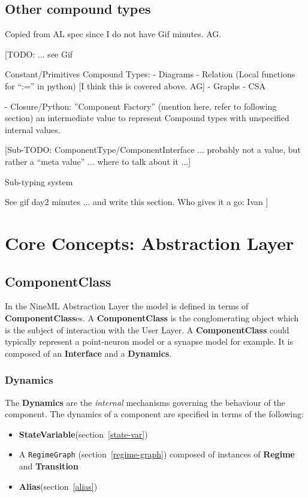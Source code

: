 \documentclass{article}
\newcommand{\ComponentClass}{{\bf{ComponentClass}}\xspace}
\newcommand{\ComponentClasses}{{\bf{ComponentClass}}es\xspace}
\newcommand{\Dynamics}{{\bf{Dynamics}}\xspace}
\newcommand{\Interface}{{\bf{Interface}}\xspace}
\newcommand{\StateVariable}{{\bf{StateVariable}}\xspace}
\newcommand{\Alias}{{\bf{Alias}}\xspace}
\newcommand{\Regime}{{\bf{Regime}}\xspace}
\newcommand{\Transition}{{\bf{Transition}}\xspace}
\begin{document}
\subsection{Other compound types}

Copied from AL spec since I do not have Gif minutes. AG.

[TODO: ... see Gif

Constant/Primitives
Compound Types:
- Diagrams
- Relation (Local functions for ``:='' in python) [I think this is covered above. AG]
- Graphs
- CSA

- Closure/Python: ''Component Factory'' (mention here, refer to following section)
  an intermediate value to represent Compound types with
  unspecified internal values.


[Sub-TODO: ComponentType/ComponentInterface ... probably not a
value, but rather a ``meta value'' ... where to talk about it ...]


Sub-typing system

See gif day2 minutes ... and write this section.
Who gives it a go: Ivan
]

\section{Core Concepts: Abstraction Layer}
\label{AbstractionL}

\subsection{ComponentClass}

In the NineML Abstraction Layer the model is defined in terms of
\ComponentClasses. A \ComponentClass is the conglomerating
object which is the subject of interaction with the User Layer.  A
\ComponentClass could typically represent a point-neuron model or
a synapse model for example. It is composed of an \Interface and
a \Dynamics.

\subsubsection{Dynamics}

The \Dynamics are the \emph{internal} mechanisms governing the behaviour
of the component. The dynamics of a component are specified in terms of
the following:

\begin{itemize}
\item \StateVariable (section~\ref{state-var})
\item A {\tt RegimeGraph} (section~\ref{regime-graph}) composed of
  instances of \Regime and \Transition
\item \Alias (section~\ref{alias})
\end{itemize}
\end{document}
